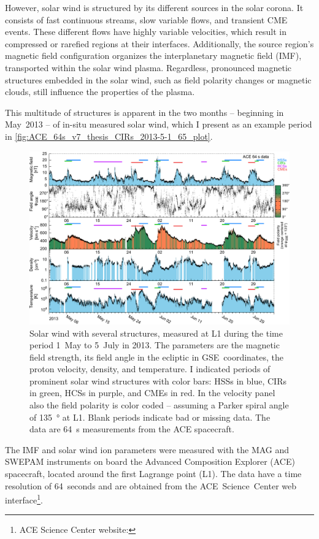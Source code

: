 However, solar wind is structured by its different sources in the solar corona. It consists of fast continuous streams, slow variable flows, and transient CME events. These different flows have highly variable velocities, which result in compressed or rarefied regions at their interfaces. Additionally, the source region's magnetic field configuration organizes the interplanetary magnetic field (IMF), transported within the solar wind plasma. Regardless, pronounced magnetic structures embedded in the solar wind, such as field polarity changes or magnetic clouds, still influence the properties of the plasma.

\pagebreak

This multitude of structures is apparent in the two months -- beginning in May~2013 -- of in-situ measured solar wind, which I present as an example period in \autoref{fig:ACE_64s_v7_thesis_CIRs_2013-5-1_65_plot}.
\begin{figure}[t]
	\centering
	\includegraphics[width=\textwidth]{figures_of_mine/gnuplots/ACE_64s_v7_thesis_CIRs_2013-5-1_65_plot.pdf}
	\caption[I created the figure myself.]
	{Solar wind with several structures, measured at L1 during the time period 1~May to 5~July in 2013. The parameters are the magnetic field strength, its field angle in the ecliptic in GSE~coordinates, the proton velocity, density, and temperature. I indicated periods of prominent solar wind structures with color bars: HSSs in blue, CIRs in green, HCSs in purple, and CMEs in red. In the velocity panel also the field polarity is color coded -- assuming a Parker spiral angle of \SI{135}{\degree} at L1. Blank periods indicate bad or missing data. The data are 64~s measurements from the ACE spacecraft.}
	\label{fig:ACE_64s_v7_thesis_CIRs_2013-5-1_65_plot}
\end{figure}
The IMF and solar wind ion parameters were measured with the MAG and SWEPAM instruments on board the Advanced Composition Explorer (ACE) spacecraft, located around the first Lagrange point (L1). The data have a time resolution of 64~seconds and are obtained from the ACE~Science~Center web interface\footnote{ACE Science Center website: }.

